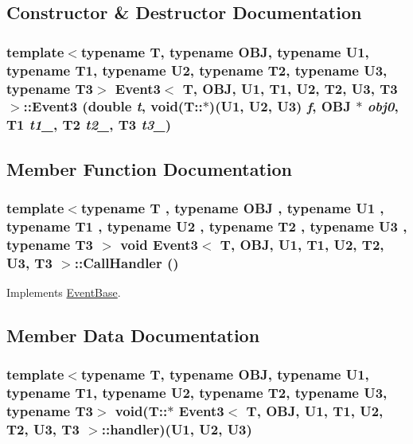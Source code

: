 \subsection{Constructor \& Destructor Documentation}
\hypertarget{classEvent3_ab6870a823964c1843b897de6ce2057c}{
\subsubsection[{Event3}]{\setlength{\rightskip}{0pt plus 5cm}template$<$typename T, typename OBJ, typename U1, typename T1, typename U2, typename T2, typename U3, typename T3$>$ {\bf Event3}$<$ T, OBJ, U1, T1, U2, T2, U3, T3 $>$::{\bf Event3} (double {\em t}, \/  void(T::$\ast$)(U1, U2, U3) {\em f}, \/  OBJ $\ast$ {\em obj0}, \/  T1 {\em t1\_}, \/  T2 {\em t2\_}, \/  T3 {\em t3\_})}}
\label{classEvent3_ab6870a823964c1843b897de6ce2057c}




\subsection{Member Function Documentation}
\hypertarget{classEvent3_1b9501d43723072952055c5abd9dc9be}{
\subsubsection[{CallHandler}]{\setlength{\rightskip}{0pt plus 5cm}template$<$typename T , typename OBJ , typename U1 , typename T1 , typename U2 , typename T2 , typename U3 , typename T3 $>$ void {\bf Event3}$<$ T, OBJ, U1, T1, U2, T2, U3, T3 $>$::CallHandler ()}}
\label{classEvent3_1b9501d43723072952055c5abd9dc9be}




Implements \hyperlink{classEventBase_121ca64dec88c8d9589c064b0060d037}{EventBase}.

\subsection{Member Data Documentation}
\hypertarget{classEvent3_2b4a3b7dbddc1dc7954942e7b2fe5745}{
\subsubsection[{handler}]{\setlength{\rightskip}{0pt plus 5cm}template$<$typename T, typename OBJ, typename U1, typename T1, typename U2, typename T2, typename U3, typename T3$>$ void(T::$\ast$ {\bf Event3}$<$ T, OBJ, U1, T1, U2, T2, U3, T3 $>$::{\bf handler})(U1, U2, U3)}}
\label{classEvent3_2b4a3b7dbddc1dc7954942e7b2fe5745}


